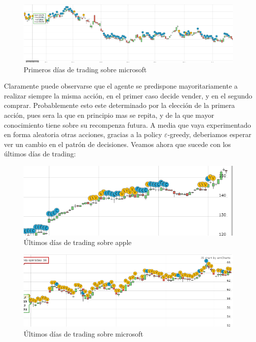 \begin{figure}[h!]
	\includegraphics[scale=0.45]{imagenes/moe_msft_ex1_1.png}
	\caption{Primeros días de trading sobre microsoft}
\end{figure}

Claramente puede observarse que el agente se predispone mayoritariamente a realizar siempre la misma acción, en el primer caso decide vender, y en el segundo comprar.
Probablemente esto este determinado por la elección de la primera acción, pues sera la que en principio mas se repita, y de la que mayor conocimiento tiene sobre su recompenza futura. A media que vaya experimentado en forma aleatoria otras acciones, gracias a la policy $\varepsilon$-greedy, deberiamos esperar ver un cambio en el patrón de decisiones.
Veamos ahora que sucede con los últimos días de trading:

\begin{figure}[h!]
	\includegraphics[scale=0.7]{imagenes/moe_appl_ex1_2.png}
	\caption{Últimos días de trading sobre apple}
\end{figure}

\begin{figure}[h!]
	\includegraphics[scale=0.7]{imagenes/moe_msft_ex1_2.png}
	\caption{Últimos días de trading sobre microsoft}
\end{figure}


